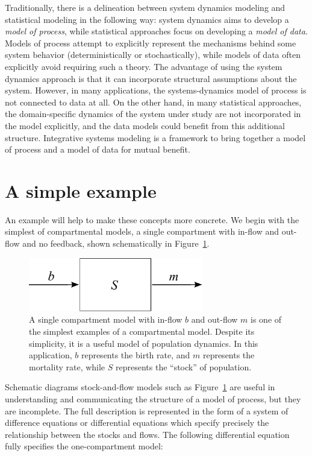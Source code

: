 Traditionally, there is a delineation between system dynamics modeling
and statistical modeling in the following way: system dynamics aims to
develop a \emph{model of process}, while statistical approaches focus
on developing a \emph{model of data}. Models of process attempt to
explicitly represent the mechanisms behind some system behavior
(deterministically or stochastically), while models of data often
explicitly avoid requiring such a theory. The advantage of using the
system dynamics approach is that it can incorporate structural
assumptions about the system.  However, in many applications, the
systems-dynamics model of process is not connected to data at all.  On
the other hand, in many statistical approaches, the domain-specific
dynamics of the system under study are not incorporated in the model
explicitly, and the data models could benefit from this additional
structure.  Integrative systems modeling is a framework to bring
together a model of process and a model of data for mutual benefit.

\section{A simple example}

An example will help to make these concepts more concrete.  We begin
with the simplest of compartmental models, a single compartment with
in-flow and out-flow and no feedback, shown schematically in
Figure~\ref{forward-sim-one-compartment}.

\begin{figure}[h]
\begin{center}
\includegraphics[width=3in]{S.pdf}
\caption{A single compartment model with in-flow $b$ and out-flow $m$
  is one of the simplest examples of a compartmental model. Despite
  its simplicity, it is a useful model of population dynamics.  In
  this application, $b$ represents the birth rate, and $m$ represents
  the mortality rate, while $S$ represents the ``stock'' of
  population.}
\label{forward-sim-one-compartment}
\end{center}
\end{figure}


Schematic diagrams stock-and-flow models such as
Figure~\ref{forward-sim-one-compartment} are useful in understanding
and communicating the structure of a model of process, but they are
incomplete. The full description is represented in the form of a
system of difference equations or differential equations which specify
precisely the relationship between the stocks and flows. The following
differential equation fully specifies the one-compartment model:

